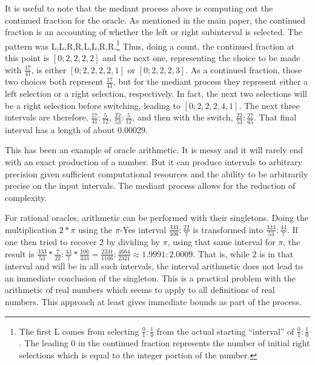 \documentclass[12pt]{article}
\theoremstyle{remark}
\begin{document}
It is useful to note that the mediant process above is computing out the continued fraction for the oracle. As mentioned in the main paper, the continued fraction is an accounting of whether the left or right subinterval is selected. The pattern was L,L,R,R,L,L,R,R.\footnote{The first L comes from selecting $\frac{0}{1}: \frac{1}{0}$ from the actual starting ``interval'' of $\frac{0}{1}: \frac{1}{0}$. The leading 0 in the continued fraction represents the number of initial right selections which is equal to the integer portion of the number.} Thus, doing a count, the continued fraction at this point is $[0;2,2,2,2]$ and the next one, representing the choice to be made with $\frac{17}{41}$, is either $[0;2,2,2,2,1]$ or $[0;2,2,2,3]$. As a continued fraction, those two choices both represent $\frac{17}{41}$, but for the mediant process they represent either a left selection or a right selection, respectively. In fact, the next two selections will be a right selection before switching, leading to $[0;2,2,2,4,1]$. The next three intervals are therefore, $\frac{17}{41}: \frac{5}{12}$, $\frac{22}{53}: \frac{5}{12}$, and then with the switch, $\frac{22}{53}: \frac{27}{65}$. That final interval has a length of about $0.00029$. 

This has been an example of oracle arithmetic. It is messy and it will rarely end with an exact production of a number. But it can produce intervals to arbitrary precision given sufficient computational resources and the ability to be arbitrarily precise on the input intervals. The mediant process allows for the reduction of complexity. 

For rational oracles, arithmetic can be performed with their singletons. Doing the multiplication $2 * \pi$ using the $\pi$-Yes interval $\frac{333}{106}: \frac{22}{7}$ is transformed into $\frac{333}{53}: \frac{44}{7}$. If one then tried to recover 2 by dividing  by $\pi$, using that same interval for $\pi$, the result is $\frac{333}{53} * \frac{7}{22}: \frac{44}{7} * \frac{106}{333} = \frac{2331}{1166}: \frac{4664}{2321} \approx 1.9991: 2.0009$. That is, while 2 is in that interval and will be in all such intervals, the interval arithmetic does not lead to an immediate conclusion of the singleton. This is a practical problem with the arithmetic of real numbers which seems to apply to all definitions of real numbers. This approach at least gives immediate bounds as part of the process.
\end{document}
